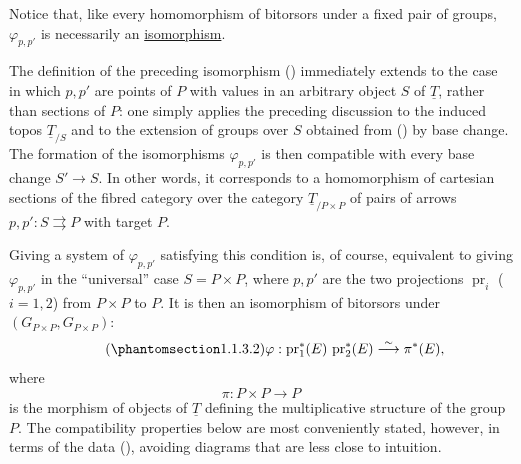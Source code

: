 Notice that, like every homomorphism of bitorsors under a fixed pair of
groups, $\varphi_{p,p'}$ is necessarily an \underline{isomorphism}.

The definition of the preceding isomorphism () immediately extends
to the case in which $p,p'$ are points of $P$ with values in an arbitrary
object $S$ of $\underline T$, rather than sections of $P$: one simply
applies the preceding discussion to the induced topos
$\underline T_{/S}$ and to the extension of groups over $S$ obtained from
() by base change. The formation of the isomorphisms
$\varphi_{p,p'}$ is then compatible with every base change
$S'\longrightarrow S$. In other words, it corresponds to a homomorphism
of cartesian sections of the fibred category over the category
$\underline T_{/P\times P}$ of pairs of arrows
$p,p':S\rightrightarrows P$ with target $P$.

Giving a system of $\varphi_{p,p'}$ satisfying this condition is, of
course, equivalent to giving $\varphi_{p,p'}$ in the ``universal'' case
$S=P\times P$, where $p,p'$ are the two projections
$\operatorname{pr}_i$ ($i=1,2$) from $P\times P$ to $P$. It is then an
isomorphism of bitorsors under
$(G_{P\times P},G_{P\times P})$:
\begin{equation}\tag{\SGARefTarget{sga7.sga7i.evii.n1-1-3-2}{1.1.3.2}}
 \varphi:\operatorname{pr}_1^*(E)\,\operatorname{pr}_2^*(E)
 \overset{\sim}{\longrightarrow}\pi^*(E),
\end{equation}
where
\[
 \pi:P\times P\longrightarrow P
\]
is the morphism of objects of $\underline T$ defining the multiplicative
structure of the group $P$. The compatibility properties below are most
conveniently stated, however, in terms of the data (), avoiding
diagrams that are less close to intuition.


